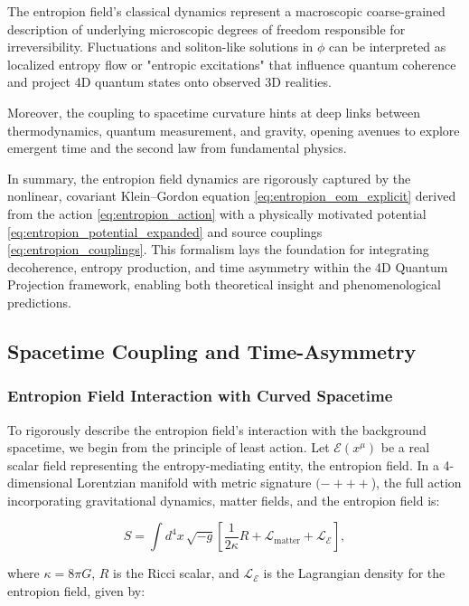 \documentclass[12pt]{article}
\begin{document}
The entropion field’s classical dynamics represent a macroscopic coarse-grained description of underlying microscopic degrees of freedom responsible for irreversibility. Fluctuations and soliton-like solutions in \(\phi\) can be interpreted as localized entropy flow or "entropic excitations" that influence quantum coherence and project 4D quantum states onto observed 3D realities.

Moreover, the coupling to spacetime curvature hints at deep links between thermodynamics, quantum measurement, and gravity, opening avenues to explore emergent time and the second law from fundamental physics.

\bigskip

In summary, the entropion field dynamics are rigorously captured by the nonlinear, covariant Klein–Gordon equation \eqref{eq:entropion_eom_explicit} derived from the action \eqref{eq:entropion_action} with a physically motivated potential \eqref{eq:entropion_potential_expanded} and source couplings \eqref{eq:entropion_couplings}. This formalism lays the foundation for integrating decoherence, entropy production, and time asymmetry within the 4D Quantum Projection framework, enabling both theoretical insight and phenomenological predictions.

\subsection{Spacetime Coupling and Time-Asymmetry}

\subsubsection*{Entropion Field Interaction with Curved Spacetime}

To rigorously describe the entropion field's interaction with the background spacetime, we begin from the principle of least action. Let \( \mathcal{E}(x^\mu) \) be a real scalar field representing the entropy-mediating entity, the entropion field. In a 4-dimensional Lorentzian manifold with metric signature \((-+++\)), the full action incorporating gravitational dynamics, matter fields, and the entropion field is:

\begin{equation}
S = \int d^4x \, \sqrt{-g} \left[ \frac{1}{2\kappa} R + \mathcal{L}_{\text{matter}} + \mathcal{L}_{\mathcal{E}} \right],
\end{equation}

where \( \kappa = 8\pi G \), \( R \) is the Ricci scalar, and \( \mathcal{L}_{\mathcal{E}} \) is the Lagrangian density for the entropion field, given by:
\end{document}
